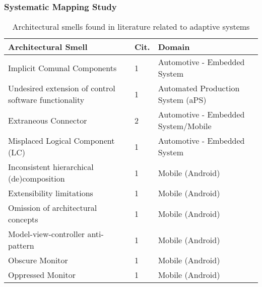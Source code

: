 \begin{frame}\frametitle{Systematic Mapping Study}

	\begin{table}[t]\tiny
		\centering
		\begin{tabularx}{\linewidth}{X|s|X}
			\hline
			\textbf{Architectural Smell}  &  \textbf{Cit.} & \textbf{Domain} \\ \hline
			Implicit Comunal Components   & 1 &Automotive - Embedded System\\
			Undesired extension of control software functionality   &1& Automated Production System (aPS) \\
			Extraneous Connector   &2& Automotive - Embedded System/Mobile\\
			Misplaced Logical Component (LC)   &1&Automotive - Embedded System\\
			Inconsistent hierarchical (de)composition &1&Mobile (Android)\\
			Extensibility limitations   &1&Mobile (Android)\\
			Omission of architectural concepts   &1&Mobile (Android)\\
			Model-view-controller anti-pattern   &1&Mobile (Android)\\
			Obscure Monitor   &1&Mobile (Android)\\
			Oppressed Monitor   &1&Mobile (Android)\\
			\hline
		\end{tabularx}
		\caption{Architectural smells found in literature related to adaptive systems}
	\end{table}
\end{frame}

